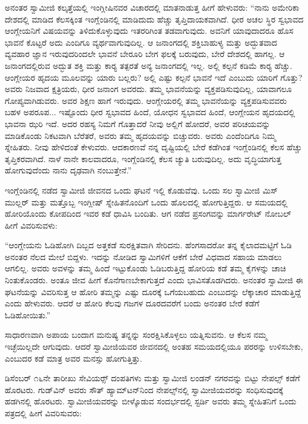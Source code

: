  ಅನಂತರ ಸ್ವಾಮೀಜಿ ಕಲ್ಕತ್ತೆಯಲ್ಲಿ ಇಂಗ್ಲೀಷಿನವರ ವಿಚಾರದಲ್ಲಿ ಮಾತನಾಡುತ್ತ ಹೀಗೆ ಹೇಳುವರು: “ನಾನು ಅಮೇರಿಕಾ ದೇಶದಲ್ಲಿ ಮಾಡಿದ ಕೆಲಸಕ್ಕಿಂತ ಇಂಗ್ಲೆಂಡಿನಲ್ಲಿ ಮಾಡಿದುದು ಹೆಚ್ಚು ತೃಪ್ತಿದಾಯಕವಾಗಿದೆ. ಧೀರ ಅಚಲ ಸ್ಥಿರ ಸ್ವಭಾವದ ಆಂಗ್ಲೇಯನಿಗೆ ವಿಷಯವನ್ನು ತಿಳಿದುಕೊಳ್ಳುವುದು ಇತರರಿಗಿಂತ ತಡವಾಗುವುದು. ಅವನಿಗೆ ಯಾವುದಾದರೂ ಹೊಸ ಭಾವನೆ ಕೊಟ್ಟರೆ ಅದು ಎಂದಿಗೂ ವ್ಯರ್ಥವಾಗುವುದಿಲ್ಲ. ಆ ಜನಾಂಗದಲ್ಲಿ ಶಕ್ತಿಬಾಹುಳ್ಯ ಮತ್ತು ಅದ್ಭುತವಾದ ವ್ಯವಹಾರ ಜ್ಞಾನ ಇರುವುದರಿಂದಲೇ ಭಾವನೆ ಬೇರೂರಿ ಬೇಗ ಫಲಕ್ಕೆ ಬರುವುದು, ಬೇರೆ ದೇಶದಲ್ಲಿ ಹಾಗಲ್ಲ. ಆ ಜನಾಂಗದಲ್ಲಿರುವ ಅದ್ಭುತ ಶಕ್ತಿ ಮತ್ತು ಕಾರ‍್ಯ ತತ್ಪರತೆ ಅನ್ಯ ಜನಾಂಗದಲ್ಲಿ ಇಲ್ಲ. ಅಲ್ಲಿ ಕಲ್ಪನೆ ಕಡಿಮೆ ಕಾರ‍್ಯ ಹೆಚ್ಚು. ಆಂಗ್ಲೇಯರ ಹೃದಯ ಮೂಲವನ್ನು ಯಾರು ಬಲ್ಲರು? ಅಲ್ಲಿ ಎಷ್ಟು ಕಲ್ಪನೆ ಭಾವನೆ ಇದೆ ಎಂಬುದು ಯಾರಿಗೆ ಗೊತ್ತು? ಅವರು ನಿಜವಾದ ಕ್ಷತ್ರಿಯರು, ಧೀರ ಜನಾಂಗ ಅವರದು. ತಮ್ಮ ಭಾವನೆಯನ್ನು ವ್ಯಕ್ತಪಡಿಸುವುದಿಲ್ಲ, ಯಾವಾಗಲೂ ಗೋಪ್ಯವಾಗಿಡುವರು. ಅವರ ಶಿಕ್ಷಣ ಹಾಗೆ ಇರುವುದು. ಆಂಗ್ಲೇಯರಲ್ಲಿ ತಮ್ಮ ಭಾವನೆಯನ್ನು ವ್ಯಕ್ತಪಡಿಸುವವರು ಬಹಳ ಅಪರೂಪ... ಇಷ್ಟೊಂದು ಧೀರ ಸ್ವಭಾವದ ಹಿಂದೆ, ಯೋಧನ ಸ್ವಭಾವದ ಹಿಂದೆ, ಆಂಗ್ಲೇಯನ ಹೃದಯದಲ್ಲಿ ಭಾವನಾ ಝರಿ ಇದೆ. ಅದರ ರಹಸ್ಯ ನಿಮಗೆ ಗೊತ್ತಾದರೆ ನೀವು ಅಲ್ಲಿಗೆ ಹೋದರೆ, ಅವರ ಪರಿಚಯವನ್ನು ಮಾಡಿಕೊಂಡು ನಿಕಟವಾಗಿ ಬೆರೆತರೆ, ಅವರು ತಮ್ಮ ಹೃದಯವನ್ನು ಬಿಚ್ಚುವರು. ಅವರು ಎಂದೆಂದಿಗೂ ನಿಮ್ಮ ಸ್ನೇಹಿತರು. ನೀವು ಹೇಳಿದಂತೆ ಕೇಳುವರು. ಆದಕಾರಣವೆ ನನ್ನ ದೃಷ್ಟಿಯಲ್ಲಿ ಬೇರೆ ಕಡೆಗಿಂತ ಇಂಗ್ಲೆಂಡಿನಲ್ಲಿ ಕೆಲಸ ಹೆಚ್ಚು ತೃಪ್ತಿಕರವಾಗಿದೆ. ನಾಳೆ ನಾನೇ ಕಾಲವಾದರೂ, ಇಂಗ್ಲೆಂಡಿನಲ್ಲಿ ಕೆಲಸ ಚ್ಯುತಿ ಬರುವುದಿಲ್ಲ. ಅದು ವೃದ್ಧಿಯಾಗುತ್ತ ಹೋಗುವುದೆಂದು ನಾನು ದೃಢವಾಗಿ ನಂಬುತ್ತೇನೆ.” 

 ಇಂಗ್ಲೆಂಡಿನಲ್ಲಿ ನಡೆದ ಸ್ವಾಮೀಜಿ ಜೀವನದ ಒಂದು ಘಟನೆ ಇಲ್ಲಿ ಕೊಡುವೆವು. ಒಂದು ಸಲ ಸ್ವಾಮೀಜಿ ಮಿಸ್ ಮುಲ್ಲರ್ ಮತ್ತು ಮತ್ತೊಬ್ಬ ಇಂಗ್ಲೀಷ್ ಸ್ನೇಹಿತನೊಂದಿಗೆ ಒಂದು ಹೊಲದಲ್ಲಿ ಹೋಗುತ್ತಿದ್ದರು. ಆ ಸಮಯದಲ್ಲಿ ಹೋರಿಯೊಂದು ಕೋಪದಿಂದ ಇವರ ಕಡೆ ಧಾವಿಸಿ ಬಂದಿತು. ಆಗ ನಡೆದ ಪ್ರಸಂಗವನ್ನು ಮಾರ್ಗರೇಟ್ ನೋಬಲ್ ಹೀಗೆ ವಿವರಿಸುವಳು: 

 “ಆಂಗ್ಲೇಯನು ಓಡಿಹೋಗಿ ದಿಬ್ಬದ ಅತ್ತಕಡೆ ಸುರಕ್ಷಿತವಾಗಿ ಸೇರಿದನು. ಹೆಂಗಸಾದರೋ ತನ್ನ ಕೈಲಾದಮಟ್ಟಿಗೆ ಓಡಿ ಅನಂತರ ನೆಲದ ಮೇಲೆ ಬಿದ್ದಳು. ಇದನ್ನು ನೋಡಿದ ಸ್ವಾಮಿಗಳಿಗೆ ಆಕೆಗೆ ಬೇರೆ ವಿಧವಾದ ಸಹಾಯ ಮಾಡಲು ಆಗಲಿಲ್ಲ. ಅವರು ಅವಳನ್ನು ತಮ್ಮ ಹಿಂದೆ ಇಟ್ಟುಕೊಂಡು ಓಡಿಬರುತ್ತಿದ್ದ ಹೋರಿಯ ಕಡೆ ತಮ್ಮ ಕೈಗಳನ್ನು ಚಾಚಿ ನಿಂತುಕೊಂಡರು. ಅಂತೂ ಜೀವ ಹೀಗೆ ಕೊನೆಗಾಣಬೇಕಾಗುತ್ತದೆ ಎಂದು ಭಾವಿಸತೊಡಗಿದರು. ಅನಂತರ ಸ್ವಾಮೀಜಿ ಈ ಘಟನೆಯನ್ನು ವಿವರಿಸುತ್ತ ಆ ಹೋರಿ ತಮ್ಮನ್ನು ಎಷ್ಟು ದೂರಕ್ಕೆ ಒಗೆಯಬಹುದು ಎಂಬುದನ್ನು ಲೆಕ್ಕಾಚಾರ ಮಾಡುತ್ತಿದ್ದೆ ಎಂದು ಹೇಳುವರು. ಆದರೆ ಆ ಹೋರಿ ಕೆಲವು ಗಜಗಳ ದೂರದವರೆಗೆ ಬಂದು ಅನಂತರ ಬೇರೆ ಕಡೆಗೆ ಓಡಿಹೋಯಿತು.” 

 ಸಾಧಾರಣವಾಗಿ ಅಪಾಯ ಬಂದಾಗ ಮನುಷ್ಯ ತನ್ನನ್ನು ಸಂರಕ್ಷಿಸಿಕೊಳ್ಳಲು ಯತ್ನಿಸುವನು. ಆ ಕೆಲಸ ನಮ್ಮ ಇಚ್ಛೆಯಿಲ್ಲದೇ ಆಗುವುದು. ಆದರೆ ಸ್ವಾಮೀಜಿಯವರ ಜೀವನದಲ್ಲಿ ಅಂತಹ ಸಮಯದಲ್ಲಿಯೂ ಪರರನ್ನು ಉಳಿಸಬೇಕು, ಎಂಬುದರ ಕಡೆ ಮಾತ್ರ ಅವರ ಮನಸ್ಸು ಹೋಗುತ್ತಿತ್ತು. 

 ಡಿಸೆಂಬರ್ ೧೬ನೇ ತಾರೀಖು ಸೇವಿಯರ್ಸ್‍‍ ದಂಪತಿಗಳು ಮತ್ತು ಸ್ವಾಮೀಜಿ ಲಂಡನ್ ನಗರವನ್ನು ಬಿಟ್ಟು ನೇಪಲ್ಸ್ ಕಡೆಗೆ ಹೊರಟರು. ಗುಡ್‌ವಿನ್ ಅವರು ಸೌತ್ ಹ್ಯಾಮ್‌ಟನ್‌ನಿಂದ ನೇಪಲ್ಸ್‌ನಲ್ಲಿ ಸ್ವಾಮೀಜಿಯವರನ್ನು ಸಂಧಿಸುವುದಕ್ಕೆ ಹಡಗಿನಲ್ಲಿ ಹೊರಟರು. ಸ್ವಾಮೀಜಿಯವರನ್ನು ಬೀಳ್ಕೊಡುವ ಸಂದರ್ಭದಲ್ಲಿ ಸ್ಟರ್ಡಿ ಅವರು ತಮ್ಮ ಸ್ನೇಹಿತನಿಗೆ ಒಂದು ಪತ್ರದಲ್ಲಿ ಹೀಗೆ ವಿವರಿಸುವರು:

